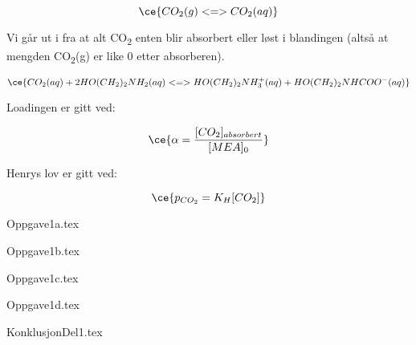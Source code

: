 \begin{equation}
    \ce{CO_{2}(g) <=> CO_{2}(aq)}
\end{equation}

Vi går ut i fra at alt CO\textsubscript{2} enten blir absorbert eller løst i blandingen (altså at mengden CO\textsubscript{2}(g) er like 0 etter absorberen).

\begin{equation}
    \ce{CO_{2}(aq)+2HO(CH_{2})_{2}NH_{2}(aq) <=> HO(CH_{2})_{2}NH_{3}^{+}(aq) + HO(CH_{2})_{2}NHCOO^{-}(aq)}
\end{equation}

Loadingen er gitt ved: 

\begin{equation}
    \ce{\alpha = \frac{[CO_{2}]_{absorbert}}{[MEA]_{0}}}
\end{equation}

Henrys lov er gitt ved:

\begin{equation}
    \ce{p_{CO_{2}}= K_{H}[CO_{2}]}
\end{equation}


{Oppgave1a.tex}

{Oppgave1b.tex}

{Oppgave1c.tex}

{Oppgave1d.tex}

{KonklusjonDel1.tex}